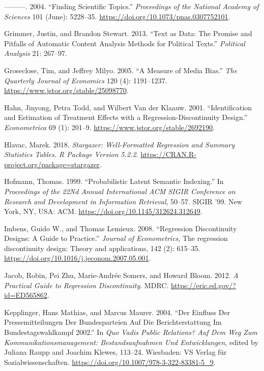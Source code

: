 \documentclass[
  12pt,
]{article}
\newlength{\cslhangindent}
\newlength{\cslentryspacingunit} %
\newenvironment{CSLReferences}[2] %
 {%
  \setlength{\parindent}{0pt}
  \ifodd #1
  \let\oldpar\par
  \def\par{\hangindent=\cslhangindent\oldpar}
  \fi
  \setlength{\parskip}{#2\cslentryspacingunit}
 }%
 {}
\begin{document}
\begin{CSLReferences}{1}{0}
\leavevmode{}%
---------. 2004. {``Finding Scientific Topics.''} \emph{Proceedings of
the National Academy of Sciences} 101 (June): 5228--35.
\url{https://doi.org/10.1073/pnas.0307752101}.

\leavevmode{}%
Grimmer, Justin, and Brandon Stewart. 2013. {``Text as Data: The Promise
and Pitfalls of Automatic Content Analysis Methods for Political
Texts.''} \emph{Political Analysis} 21: 267--97.

\leavevmode{}%
Groseclose, Tim, and Jeffrey Milyo. 2005. {``A Measure of Media Bias.''}
\emph{The Quarterly Journal of Economics} 120 (4): 1191--1237.
\url{https://www.jstor.org/stable/25098770}.

\leavevmode{}%
Hahn, Jinyong, Petra Todd, and Wilbert Van der Klaauw. 2001.
{``Identification and Estimation of Treatment Effects with a
Regression-Discontinuity Design.''} \emph{Econometrica} 69 (1): 201--9.
\url{https://www.jstor.org/stable/2692190}.

\leavevmode{}%
Hlavac, Marek. 2018. \emph{Stargazer: Well-Formatted Regression and
Summary Statistics Tables. R Package Version 5.2.2}.
\url{https://CRAN.R-project.org/package=stargazer}.

\leavevmode{}%
Hofmann, Thomas. 1999. {``Probabilistic Latent Semantic Indexing.''} In
\emph{Proceedings of the 22Nd Annual International {ACM} {SIGIR}
Conference on Research and Development in Information Retrieval},
50--57. {SIGIR} '99. New York, {NY}, {USA}: {ACM}.
\url{https://doi.org/10.1145/312624.312649}.

\leavevmode{}%
Imbens, Guido W., and Thomas Lemieux. 2008. {``Regression Discontinuity
Designs: A Guide to Practice.''} \emph{Journal of Econometrics}, The
regression discontinuity design: Theory and applications, 142 (2):
615--35. \url{https://doi.org/10.1016/j.jeconom.2007.05.001}.

\leavevmode{}%
Jacob, Robin, Pei Zhu, Marie-Andrée Somers, and Howard Bloom. 2012.
\emph{A Practical Guide to Regression Discontinuity}. {MDRC}.
\url{https://eric.ed.gov/?id=ED565862}.

\leavevmode{}%
Kepplinger, Hans Mathias, and Marcus Maurer. 2004. {``Der Einfluss Der
Pressemitteilungen Der Bundesparteien Auf Die Berichterstattung Im
Bundestagswahlkampf 2002.''} In \emph{Quo Vadis Public Relations? Auf
Dem Weg Zum Kommunikationsmanagement: Bestandsaufnahmen Und
Entwicklungen}, edited by Juliana Raupp and Joachim Klewes, 113--24.
Wiesbaden: {VS} Verlag für Sozialwissenschaften.
\url{https://doi.org/10.1007/978-3-322-83381-5_9}.


\end{CSLReferences}
\end{document}
